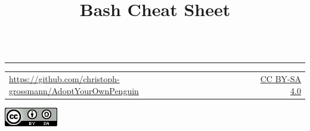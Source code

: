 \documentclass[a4paper, 17pt]{beamer}
\title{Bash Cheat Sheet}
\newcommand\fixboxspacing{\vskip-2.5\baselineskip}
\begin{document}
	\begin{frame}[plain]%
		\titlepage
		\vfill%
		\begin{columns}%
			\begin{column}[t]{0.5\linewidth}%
			\end{column}
			\begin{column}[t]{0.5\linewidth}
			\end{column}
		\end{columns}
		\fixboxspacing
		\vfill
		\begin{center}
			\noindent\color{secondary}\rule{.8\linewidth}{6pt}
		\end{center}
		\begin{center}
			\begin{tabular}{p{.65\linewidth}r}
				\url{https://github.com/christoph-grossmann/AdoptYourOwnPenguin} &
				\href{http://creativecommons.org/licenses/by-sa/4.0/}{CC BY-SA 4.0}
			\end{tabular}
			\includegraphics[height=1\baselineskip]{../../graphics/cc-by-sa.png}
		\end{center}
	\end{frame}
\end{document}

